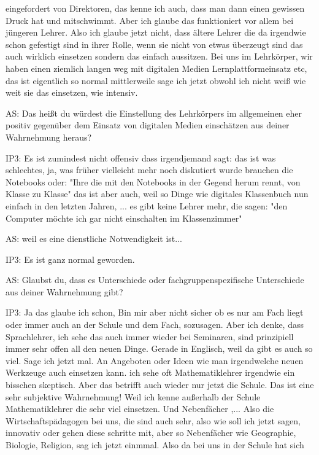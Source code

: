 \documentclass[fontsize=11pt,paper=a4]{scrbook}
\begin{document}
{\begin{itemize*}
eingefordert von Direktoren, das kenne ich auch, dass man dann einen gewissen
Druck hat und mitschwimmt. Aber ich
glaube das funktioniert vor allem bei
jüngeren Lehrer. Also ich glaube jetzt nicht,
dass ältere Lehrer die da
irgendwie schon gefestigt sind in ihrer Rolle,
wenn sie nicht von etwas überzeugt sind
das auch wirklich einsetzen sondern das einfach
aussitzen.
Bei uns im Lehrkörper, wir haben einen 
ziemlich langen weg mit digitalen Medien
Lernplattformeinsatz etc,
das ist eigentlich so
normal mittlerweile sage ich jetzt
obwohl ich nicht weiß wie weit sie das einsetzen, wie
intensiv.
\item[AS:] Das heißt du würdest die Einstellung des Lehrkörpers im
allgemeinen eher positiv gegenüber dem
Einsatz von digitalen Medien einschätzen
aus deiner Wahrnehmung heraus?
\item[IP3:] Es ist zumindest
nicht offensiv dass irgendjemand sagt: 
das ist was schlechtes, ja, was früher
vielleicht mehr noch diskutiert wurde
brauchen die  Notebooks oder: "Ihre die
mit den Notebooks in der Gegend herum rennt, von Klasse zu Klasse"
das ist aber auch, weil so Dinge wie digitales Klassenbuch nun
einfach in den letzten Jahren, ...
es gibt keine Lehrer mehr, die sagen: "den
Computer möchte ich gar nicht
einschalten im Klassenzimmer"
\item[AS:] weil es eine dienstliche Notwendigkeit ist...
\item[IP3:] Es ist ganz normal geworden.
\item[AS:]Glaubst du, dass es Unterschiede oder fachgruppenspezifische
Unterschiede aus deiner Wahrnehmung gibt?
\item[IP3:] Ja das glaube ich schon, Bin mir aber nicht
sicher ob es nur am Fach liegt oder immer
auch an der Schule und dem Fach, sozusagen. Aber ich denke, dass Sprachlehrer,
ich sehe das auch immer wieder bei Seminaren, sind
prinzipiell immer sehr offen all den
neuen Dinge. Gerade in Englisch, weil da
gibt es auch so viel. Sage ich jetzt mal.
An Angeboten oder Ideen wie man
irgendwelche neuen Werkzeuge auch
einsetzen kann.
ich sehe oft Mathematiklehrer irgendwie
ein bisschen skeptisch.
Aber das betrifft auch wieder nur jetzt
die Schule. Das ist eine sehr subjektive
Wahrnehmung! Weil ich kenne außerhalb der Schule
Mathematiklehrer die sehr viel einsetzen. Und Nebenfächer ,... Also die Wirtschaftspädagogen bei uns, die sind auch sehr, also wie soll ich jetzt sagen, innovativ oder gehen
diese schritte mit, aber so Nebenfächer
wie Geographie, Biologie, Religion,  sag ich jetzt einmmal. Also
da bei uns in der Schule hat sich

\end{itemize*}}
\end{document}
